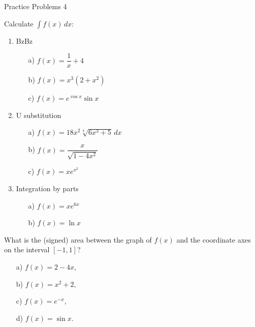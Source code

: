  \begin{center}\begin{large} Practice Problems 4
 \end{large}\end{center}
 \bigskip

 
\begin{problem}
    Calculate $\displaystyle \int f(x)\,dx$:
    \begin{enumerate}
        \item BzBz
        \begin{enumerate}
            \item[a)] $f(x)=\dfrac{1}{x}+4$
            \item[b)] $f(x)=x^3(2+x^2)$
            \item[c)] $f(x)=e^{\cos x}\sin x$
        \end{enumerate}
        
        \item U substitution
        \begin{enumerate}
            \item[a)] $f(x)= 18x^2 \sqrt[4]{6x^3 + 5} \, dx$
            \item[b)] $f(x) = \dfrac{x}{\sqrt{1 - 4x^2}}$
            \item[c)] $f(x) = x e^{x^2}$
        \end{enumerate}
        
        \item Integration by parts
        \begin{enumerate}
            \item[a)] $f(x) = x e^{6x}$
            \item[b)] $f(x) = \ln{x}$
        \end{enumerate}
    \end{enumerate}
  

\end{problem}
\bigskip

\begin{problem}
What is the (signed) area between the graph of $f(x)$ and the coordinate axes on the interval $[-1,1]$?
    \begin{enumerate}
        \item[a) ] $f(x)=2-4x$,
        \item[b) ] $f(x)=x^2+2$,
        \item[c) ] $f(x)=e^{-x}$,
        \item[d) ] $f(x)=\sin {x}$.
    \end{enumerate}
\end{problem}

